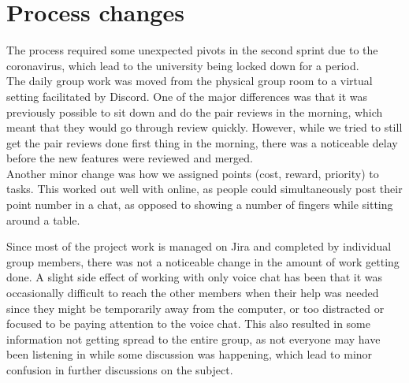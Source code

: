 \section{Process changes}
The process required some unexpected pivots in the second sprint due to the coronavirus, which lead to the university being locked down for a period.
\\
The daily group work was moved from the physical group room to a virtual setting facilitated by Discord.
One of the major differences was that it was previously possible to sit down and do the pair reviews in the morning, which meant that they would go through review quickly.
However, while we tried to still get the pair reviews done first thing in the morning, there was a noticeable delay before the new features were reviewed and merged.\\
Another minor change was how we assigned points (cost, reward, priority) to tasks. This worked out well with online, as people could simultaneously post their point number in a chat, as opposed to showing a number of fingers while sitting around a table.

Since most of the project work is managed on Jira and completed by individual group members, there was not a noticeable change in the amount of work getting done.
A slight side effect of working with only voice chat has been that it was occasionally difficult to reach the other members when their help was needed since they might be temporarily away from the computer, or too distracted or focused to be paying attention to the voice chat.
This also resulted in some information not getting spread to the entire group, as not everyone may have been listening in while some discussion was happening, which lead to minor confusion in further discussions on the subject.
